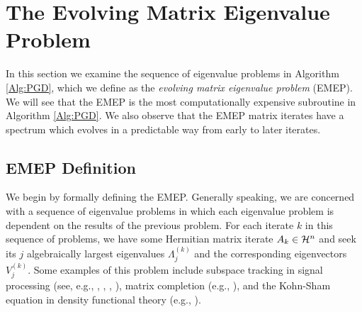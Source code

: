 \section{The Evolving Matrix Eigenvalue Problem}		\label{Subsec:evol_mats-spectral_props}


In this section we examine the sequence of eigenvalue problems in Algorithm \ref{Alg:PGD}, which we define as the \textit{evolving matrix eigenvalue problem} (EMEP).
We will see that the EMEP is the most computationally expensive subroutine in Algorithm \ref{Alg:PGD}.  
We also observe that the EMEP matrix iterates have a spectrum which evolves in a predictable way from early to later iterates.




\subsection{EMEP Definition} 	\label{Subsubsec:evol_mats-EMEP_definition}


We begin by formally defining the EMEP.
Generally speaking, we are concerned with a sequence of eigenvalue problems in which each eigenvalue problem is dependent on the results of the previous problem.  
For each iterate $k$ in this sequence of problems, we have some Hermitian matrix iterate $A_k \in {\mathcal H}^n$ and seek its $j$ algebraically largest eigenvalues $\Lambda^{(k)}_j$ and the corresponding eigenvectors $V^{(k)}_j$.  
Some examples of this problem include subspace tracking in signal processing (see, e.g., \cite{comon1990tracking}, \cite{stewart1992updating}, \cite{yang1995projection}, \cite{doukopoulos2008fast}), matrix completion (e.g., \cite{ngo2012scaled}), and the Kohn-Sham equation in density functional theory (e.g., \cite{saad2010numerical}).



